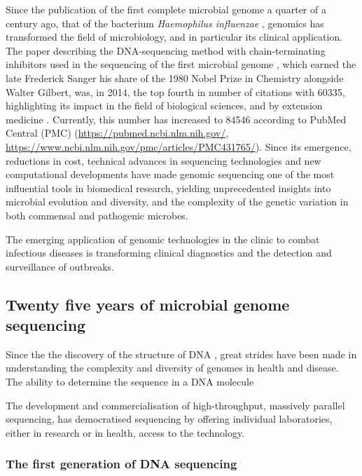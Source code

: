 Since the publication of the first complete microbial genome a quarter of a century ago, that of the bacterium \textit{Haemophilus influenzae} \citep{hood_dna_1996}, genomics has transformed the field of microbiology, and in particular its clinical application. The paper describing the DNA-sequencing method with chain-terminating inhibitors used in the sequencing of the first microbial genome \citep{sanger_dna_1977}, which earned the late Frederick Sanger his share of the 1980 Nobel Prize in Chemistry alongside Walter Gilbert, was, in 2014, the top fourth in number of citations with 60335, highlighting its impact in the field of biological sciences, and by extension medicine \citep{van_noorden_top_2014}. Currently, this number has increased to 84546 according to PubMed Central\textsuperscript{\small\textregistered} (PMC) (\url{https://pubmed.ncbi.nlm.nih.gov/, https://www.ncbi.nlm.nih.gov/pmc/articles/PMC431765/}). Since its emergence, reductions in cost, technical advances in sequencing technologies and new computational developments have made genomic sequencing one of the most influential tools in biomedical research, yielding unprecedented insights into microbial evolution and diversity, and the complexity of the genetic variation in both commensal and pathogenic microbes. 

The emerging application of genomic technologies in the clinic to combat infectious diseases is transforming clinical diagnostics and the detection and surveillance of outbreaks. 

\subsection{Twenty five years of microbial genome sequencing}

Since the  the discovery of the structure of DNA \citep{watson_molecular_1953}, great strides have been made in understanding the complexity and diversity of genomes in health and disease. The ability to determine the sequence in a DNA molecule  

The development and commercialisation of high-throughput, massively parallel sequencing, has democratised sequencing by offering individual laboratories, either in research or in health, access to the technology.

\subsubsection{The first generation of DNA sequencing}

